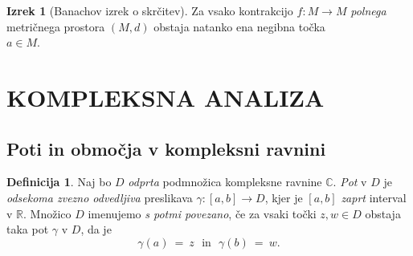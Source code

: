 \documentclass[11pt]{article}
\theoremstyle{definition}
\newtheorem{definicija}{Definicija}[section]
\theoremstyle{definition}
\theoremstyle{definition}
\newtheorem{izrek}{Izrek}[section]
\begin{document}
\begin{izrek}[Banachov izrek o skrčitev]

Za vsako kontrakcijo $f: M \rightarrow M$ \textit{polnega} metričnega prostora $(M, d)$ obstaja natanko ena negibna točka \\$a \in M$.

\end{izrek}
\vspace{0.5cm}



\pagebreak


\section{KOMPLEKSNA ANALIZA}
\vspace{0.5cm}


\subsection{Poti in območja v kompleksni ravnini}
\vspace{0.5cm}

\begin{definicija}

Naj bo $D$ \textit{odprta} podmnožica kompleksne ravnine $\mathbb{C}$. \textit{Pot} v $D$ je \textit{odsekoma zvezno odvedljiva} preslikava $\gamma: [a, b] \rightarrow D$, kjer je $[a, b]$ \textit{zaprt} interval v $\mathbb{R}$. Množico $D$ imenujemo \textit{s potmi povezano}, če za vsaki točki $z, w \in D$ obstaja taka pot $\gamma$ v $D$, da je 
$$\gamma(a) ~=~ z ~~~\text{in}~~~ \gamma(b) ~=~ w.$$

\end{definicija}
\vspace{0.5cm}
\end{document}
